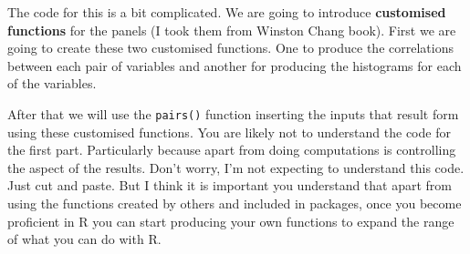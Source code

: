 \documentclass[]{book}
\theoremstyle{definition}
\theoremstyle{definition}
\theoremstyle{definition}
\theoremstyle{remark}
\begin{document}
The code for this is a bit complicated. We are going to introduce
\textbf{customised functions} for the panels (I took them from Winston
Chang book). First we are going to create these two customised
functions. One to produce the correlations between each pair of
variables and another for producing the histograms for each of the
variables.

After that we will use the \texttt{pairs()} function inserting the
inputs that result form using these customised functions. You are likely
not to understand the code for the first part. Particularly because
apart from doing computations is controlling the aspect of the results.
Don't worry, I'm not expecting to understand this code. Just cut and
paste. But I think it is important you understand that apart from using
the functions created by others and included in packages, once you
become proficient in R you can start producing your own functions to
expand the range of what you can do with R.
\end{document}
